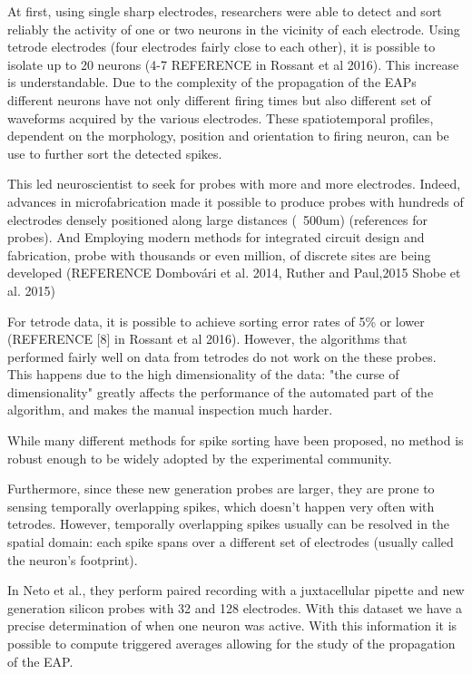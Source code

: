 \documentclass{article}
\begin{document}
At first, using single sharp electrodes, researchers were able to detect and sort reliably the activity of one or two neurons in the vicinity of each electrode. Using tetrode electrodes (four electrodes fairly close to each other), it is possible to isolate up to 20 neurons (4-7 REFERENCE in Rossant et al 2016). This increase is understandable. Due to the complexity of the propagation of the EAPs different neurons have not only different firing times but also different set of waveforms acquired by the various electrodes. These spatiotemporal profiles, dependent on the morphology, position and orientation to firing neuron, can be use to further sort the detected spikes.  

This led neuroscientist to seek for probes with more and more electrodes. Indeed, advances in microfabrication made it possible to produce probes with hundreds of electrodes densely positioned along large distances (~500um) (references for probes). And Employing modern methods for integrated circuit design and fabrication, probe with thousands or even million, of discrete sites are being developed (REFERENCE Dombovári et al. 2014, Ruther and Paul,2015 Shobe et al. 2015)

For tetrode data, it is possible to achieve sorting error rates of 5\% or lower (REFERENCE [8] in Rossant et al 2016). However, the algorithms that performed fairly well on data from tetrodes do not work on the these probes. This happens due to the high dimensionality of the data: "the curse of dimensionality" greatly affects the performance of the automated part of the algorithm, and makes the manual inspection much harder.

While many different methods for spike sorting have been proposed, no method is robust enough to be widely adopted by the experimental community.

Furthermore, since these new generation probes are larger, they are prone to sensing temporally overlapping spikes, which doesn't happen very often with tetrodes. However, temporally overlapping spikes usually can be resolved in the spatial domain: each spike spans over a different  set of electrodes (usually called the neuron's footprint).

In Neto et al., they perform paired recording with a juxtacellular pipette and new generation silicon probes with 32 and 128 electrodes. With this dataset we have a precise determination of when one neuron was active. With this information it is possible to compute triggered averages allowing for the study of the propagation of the EAP.
\end{document}
